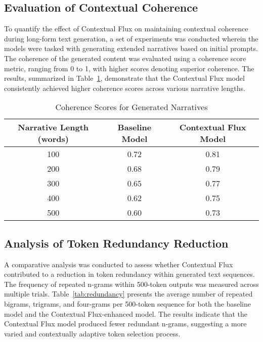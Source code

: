 \documentclass{article}
\begin{document}
\subsection{Evaluation of Contextual Coherence}

To quantify the effect of Contextual Flux on maintaining contextual coherence during long-form text generation, a set of experiments was conducted wherein the models were tasked with generating extended narratives based on initial prompts. The coherence of the generated content was evaluated using a coherence score metric, ranging from 0 to 1, with higher scores denoting superior coherence. The results, summarized in Table~\ref{tab:coherence_scores}, demonstrate that the Contextual Flux model consistently achieved higher coherence scores across various narrative lengths.

\begin{table}[h]
	\centering
	\caption{Coherence Scores for Generated Narratives}
	\label{tab:coherence_scores}
	\begin{tabular}{|c|c|c|}
		\hline
		\textbf{Narrative Length (words)} & \textbf{Baseline Model} & \textbf{Contextual Flux Model} \\
		\hline
		100 & 0.72 & 0.81 \\
		200 & 0.68 & 0.79 \\
		300 & 0.65 & 0.77 \\
		400 & 0.62 & 0.75 \\
		500 & 0.60 & 0.73 \\
		\hline
	\end{tabular}
\end{table}

\subsection{Analysis of Token Redundancy Reduction}

A comparative analysis was conducted to assess whether Contextual Flux contributed to a reduction in token redundancy within generated text sequences. The frequency of repeated n-grams within 500-token outputs was measured across multiple trials. Table~\ref{tab:redundancy} presents the average number of repeated bigrams, trigrams, and four-grams per 500-token sequence for both the baseline model and the Contextual Flux-enhanced model. The results indicate that the Contextual Flux model produced fewer redundant n-grams, suggesting a more varied and contextually adaptive token selection process.
\end{document}
